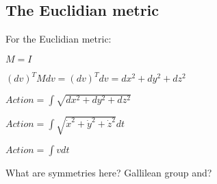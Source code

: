 
\subsection{The Euclidian metric}

For the Euclidian metric:

\(M=I\)

\((dv )^TMdv =(dv)^T dv = d x^2+d y^2 + d z^2\)

\(Action = \int \sqrt {dx^2+dy^2 + dz^2}\)

\(Action = \int \sqrt {\dot x^2+\dot y^2 + \dot z^2}d t\)

\(Action = \int vd t\)

What are symmetries here? Gallilean group and?

